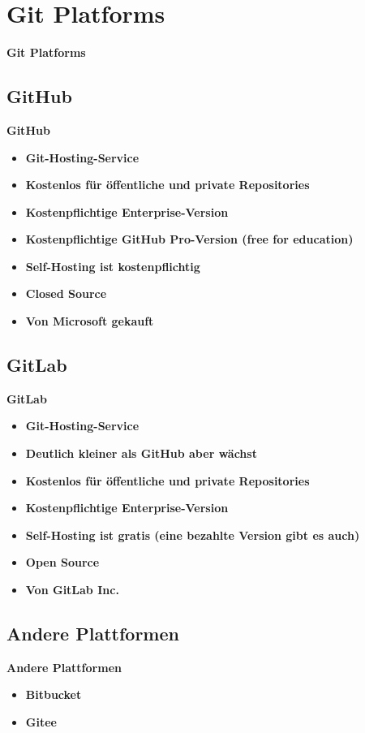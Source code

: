 \section{Git Platforms}\label{sec:git-platforms}
\begin{frame}[c]
    \centering
    \Large
    \textbf{Git Platforms}
\end{frame}

\subsection{GitHub}\label{subsec:github}
\begin{frame}[c]
    \slidehead
    \centering
    \large
    \textbf{GitHub}
    \vspace{1em}
    \begin{itemize}[<+->]
        \item \textbf{Git-Hosting-Service}
        \item \textbf{Kostenlos für öffentliche und private Repositories}
        \item \textbf{Kostenpflichtige Enterprise-Version}
        \item \textbf{Kostenpflichtige GitHub Pro-Version (free for education)}
        \item \textbf{Self-Hosting ist kostenpflichtig}
        \item \textbf{Closed Source}
        \item \textbf{Von Microsoft gekauft}
    \end{itemize}
\end{frame}

\subsection{GitLab}\label{subsec:gitlab}
\begin{frame}[c]
    \slidehead
    \centering
    \large
    \textbf{GitLab}
    \vspace{1em}
    \begin{itemize}[<+->]
        \item \textbf{Git-Hosting-Service}
        \item \textbf{Deutlich kleiner als GitHub aber wächst}
        \item \textbf{Kostenlos für öffentliche und private Repositories}
        \item \textbf{Kostenpflichtige Enterprise-Version}
        \item \textbf{Self-Hosting ist gratis (eine bezahlte Version gibt es auch)}
        \item \textbf{Open Source}
        \item \textbf{Von GitLab Inc.}
    \end{itemize}
\end{frame}

\subsection{Andere Plattformen}\label{subsec:andere-plattformen}
\begin{frame}[c]
    \slidehead
    \centering
    \large
    \textbf{Andere Plattformen}
    \vspace{1em}
    \begin{itemize}[<+->]
        \item \textbf{Bitbucket}
        \item \textbf{Gitee}
    \end{itemize}
\end{frame}
